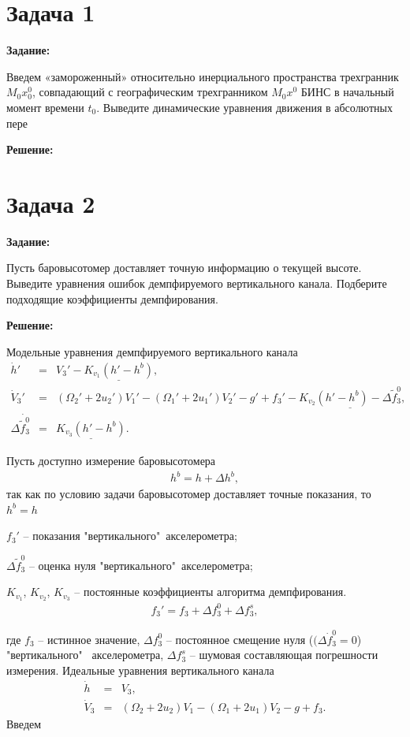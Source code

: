\documentclass[a4paper,14pt]{article}
\theoremstyle{plain} %
\theoremstyle{definition} %
\theoremstyle{remark} %
\begin{document}
\thispagestyle{empty} %
\normalsize{
\newpage
\tableofcontents
\newpage

\section{Задача 1}
\textbf{Задание:}

Введем «замороженный» относительно инерциального пространства трехгранник $M_0x_0^0$,
совпадающий с географическим трехгранником $M_0x^0$ БИНС в начальный момент времени $t_0$.
Выведите динамические уравнения движения в абсолютных пере

\textbf{Решение:}

\newpage
\section{Задача 2}
\textbf{Задание:}

Пусть баровысотомер доставляет точную информацию о текущей высоте. Выведите
уравнения ошибок демпфируемого вертикального канала. Подберите подходящие
коэффициенты демпфирования.

\textbf{Решение:}

Модельные уравнения демпфируемого вертикального канала
\begin{eqnarray*}
    {\dot  h}'  &=& V_3' - \underline{K_{v_1}\left(h' - h^b\right)}, \nonumber \\
    {\dot V_3}'  &=& (\Omega_2' +  2 u_2') V_1' - (\Omega_1' +
    2u_1') V_2'- g' + f_3' - \underline{K_{v_2}\left(h' - h^b\right) - \Delta {\widetilde f}_3^0} ,\nonumber \\
    \Delta {\dot {\widetilde{f}_3^0 }}  & = & \underline{K_{v_3}\left(h' - h^b\right)}.
\end{eqnarray*}

Пусть доступно измерение баровысотомера
\begin{eqnarray*}
    h^b = h + \Delta h^b ,
\end{eqnarray*}
так как по условию задачи баровысотомер доставляет точные показания, то $h^b=h$

$f_3'$  -- показания "вертикального"\ акселерометра;

$\Delta {\widetilde f}_3^0$ -- оценка нуля "вертикального"\ акселерометра;

$K_{v_1}$, $K_{v_2}$, $K_{v_3}$  --  постоянные коэффициенты алгоритма
демпфирования.
\begin{eqnarray*}
    f_3' =  f_3 + \Delta f_3^0 + \Delta f_3^s,
\end{eqnarray*}
}
где $f_3$ -- истинное значение,
$\Delta f_3^0$ -- постоянное смещение нуля ($(\Delta {\dot f}_3^0 = 0$)  "вертикального" \ акселерометра,
$\Delta f_3^s$ --  шумовая составляющая погрешности измерения.
Идеальные уравнения вертикального канала
\begin{eqnarray*}
    {\dot  h}  &=& V_3, \nonumber \\
    {\dot V_3}  &=& (\Omega_2 +  2 u_2) V_1 - (\Omega_1 +
    2u_1) V_2- g + f_3.
\end{eqnarray*}
Введем
\end{document}
